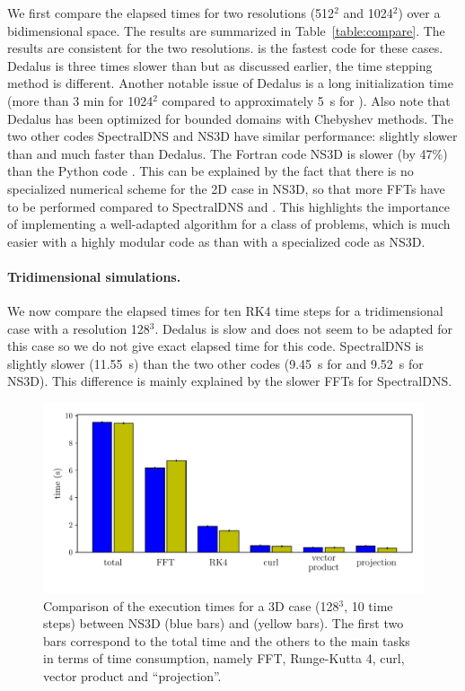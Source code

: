 \documentclass{../jors}
\begin{document}
We first compare the elapsed times for two resolutions (512$^2$ and 1024$^2$) over
a bidimensional space.  The results are summarized in Table~\ref{table:compare}.
%
The results are consistent for the two resolutions.  is the
fastest code for these cases. Dedalus is three times slower than
 but as discussed earlier, the time stepping method is
different. Another notable issue of Dedalus is a long initialization time (more
than 3 min for 1024$^2$ compared to approximately 5~s for ).
Also note that Dedalus has been optimized for bounded domains with Chebyshev
methods.
%
The two other codes SpectralDNS and NS3D have similar performance: slightly slower
than  and much faster than Dedalus.
%
The Fortran code NS3D is slower (by 47\%) than the Python code .
This can be explained by the fact that there is no specialized numerical scheme
for the 2D case in NS3D, so that more FFTs have to be performed compared to
SpectralDNS and .
%
This highlights the importance of implementing a well-adapted algorithm for
a class of problems, which is much easier with a highly modular code as
 than with a specialized code as NS3D.


\paragraph{Tridimensional simulations.}

We now compare the elapsed times for ten RK4 time steps for a tridimensional case
with a resolution 128$^3$.
%
Dedalus is slow and does not seem to be adapted for this case so we do not give
exact elapsed time for this code.
%
SpectralDNS is slightly slower (11.55~s) than the two other codes (9.45~s for
 and 9.52~s for NS3D). This difference is mainly explained by the
slower FFTs for SpectralDNS.

\begin{figure}[htp]
\centering
\includegraphics[width=\linewidth]{./tmp/fig_compare_with_ns3d}
\caption{Comparison of the execution times for a 3D case (128$^3$, 10 time steps)
between NS3D (blue bars) and  (yellow bars).
%
The first two bars correspond to the total time and the others to the main tasks
in terms of time consumption, namely FFT, Runge-Kutta 4, curl, vector product and
``projection''. }
\label{fig:compare:with:ns3d}
\end{figure}
\end{document}
